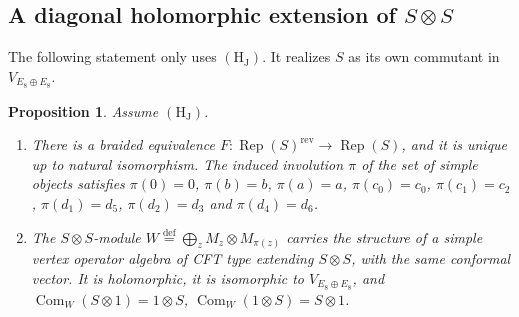 \documentclass[leqno]{article}
\newcommand{\co}{\colon}
\newcommand{\ot}{\otimes}
\newcommand{\ov}{\overset}
\DeclareMathOperator{\Rep}{Rep} %
\newtheorem{prop}[thm]{Proposition}
\numberwithin{equation}{section}
\begin{document}
\subsection{A diagonal holomorphic extension of \texorpdfstring{$S \ot S$}{S x S}}
\label{subsec:diagonal}

The following statement only uses $\mathrm{(H_J)}$. It realizes $S$ as its own commutant in $V_{E_8 \oplus E_8}$.

\begin{prop}
\label{prop:diagonal}
Assume $\mathrm{(H_J)}$.
\begin{enumerate}
\item There is a braided equivalence $F \co \Rep(S)^{\mathrm{rev}} \to \Rep(S)$, and it is unique up to natural isomorphism. The induced involution $\pi$ of the set of simple objects satisfies $\pi(0) = 0$, $\pi(b) = b$, $\pi(a) = a$, $\pi(c_0) = c_0$, $\pi(c_1) = c_2$, $\pi(d_1) = d_5$, $\pi(d_2) = d_3$ and $\pi(d_4) = d_6$.
\item The $S \ot S$-module $W \ov{\mathrm{def}}{=} \bigoplus_z M_z \ot M_{\pi(z)}$ carries the structure of a simple vertex operator algebra of CFT type extending $S \ot S$, with the same conformal vector. It is holomorphic, it is isomorphic to $V_{E_8 \oplus E_8}$, and $\operatorname{Com}_W(S \ot 1) = 1 \ot S$, $\operatorname{Com}_W(1 \ot S) = S \ot 1$.
\end{enumerate}
\end{prop}
\end{document}
